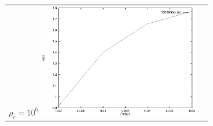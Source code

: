 \documentclass[a4paper]{IEEEtran}
\begin{document}
\begin{figure}
\begin{center}
\begin{tabular}{p{7cm}p{7cm}}
        $\rho_c = 10^6$ \newline \includegraphics[width=7cm]{figures/1000000m.eps}
        \\ 
    \end{tabular}
    \end{center}
    \end{figure} 

\end{document}
